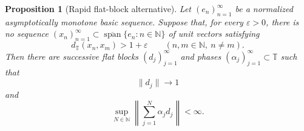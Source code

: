 \documentclass[10pt,a4paper]{amsart}
\newtheorem{proposition}{Proposition}
\newcommand{\N}{\mathbb N}
\newcommand{\T}{\mathbb T}
\newcommand{\distT}{d_{\mathbb T}}
\newcommand{\eps}{\varepsilon}
\newcommand{\spancl}[1]{\overline{\operatorname{span}}\{#1\}}
\begin{document}
\begin{proposition}[Rapid flat-block alternative]
\label{p1-first:prop:rapid}
Let $(e_n)_{n=1}^{\infty}$ be a normalized asymptotically monotone basic sequence. Suppose that, for every $\eps>0$, there is no sequence $(x_n)_{n=1}^{\infty}\subset \spancl{e_n:n\in\N}$ of unit vectors satisfying
\begin{equation*}
        \distT(x_n,x_m)>1+\eps \qquad(n,m\in\N,\ n\ne m).
\end{equation*}
Then there are successive flat blocks $(d_j)_{j=1}^{\infty}$ and phases $(\alpha_j)_{j=1}^{\infty}\subset\T$ such that
\begin{equation*}
        \|d_j\|\longrightarrow 1
\end{equation*}
and
\begin{equation*}
        \sup_{N\in\N}\left\|\sum_{j=1}^{N}\alpha_jd_j\right\|<\infty.
\end{equation*}
\end{proposition}
\end{document}
